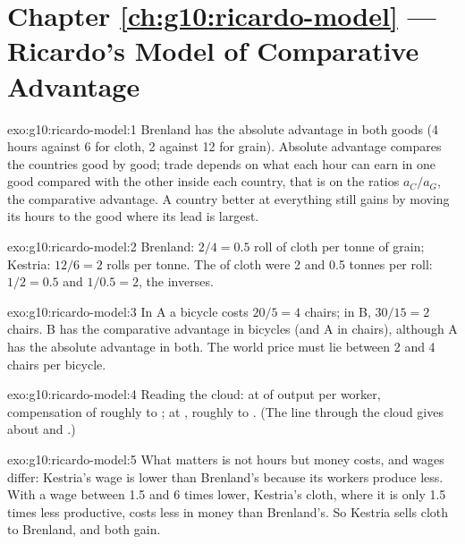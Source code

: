 \section*{Chapter \ref{ch:g10:ricardo-model} --- Ricardo's Model of Comparative Advantage}

\begin{solution}{exo:g10:ricardo-model:1}
Brenland has the absolute advantage in both goods (4 hours against 6 for cloth, 2 against 12 for grain). Absolute
advantage compares the countries good by good; trade depends on what each hour can earn in one good compared with
the other inside each country, that is on the ratios $a_C/a_G$, the comparative advantage. A country better at
everything still gains by moving its hours to the good where its lead is largest.
\end{solution}

\begin{solution}{exo:g10:ricardo-model:2}
Brenland: $2/4 = 0.5$ roll of cloth per tonne of grain; Kestria: $12/6 = 2$ rolls per tonne. The  of
cloth were 2 and 0.5 tonnes per roll: $1/2 = 0.5$ and $1/0.5 = 2$, the inverses.
\end{solution}

\begin{solution}{exo:g10:ricardo-model:3}
In A a bicycle costs $20/5 = 4$ chairs; in B, $30/15 = 2$ chairs. B has the comparative advantage in bicycles (and
A in chairs), although A has the absolute advantage in both. The world price must lie between 2 and 4 chairs per
bicycle.
\end{solution}

\begin{solution}{exo:g10:ricardo-model:4}
Reading the cloud: at  of output per worker, compensation of roughly  to ; at
, roughly  to . (The line through the cloud gives about  and
.)
\end{solution}

\begin{solution}{exo:g10:ricardo-model:5}
What matters is not hours but money costs, and wages differ: Kestria's wage is lower than Brenland's because its
workers produce less. With a wage between 1.5 and 6 times lower, Kestria's cloth, where it is only 1.5 times less
productive, costs less in money than Brenland's. So Kestria sells cloth to Brenland, and both gain.
\end{solution}

